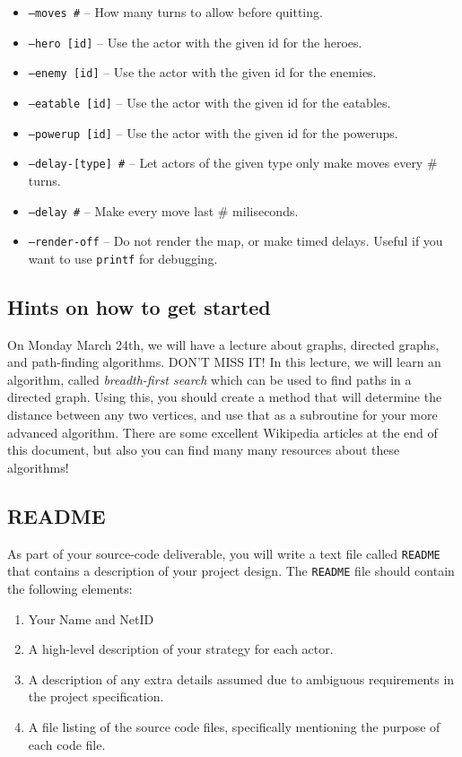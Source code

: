 \documentclass[11pt]{article}
\begin{document}
\begin{itemize}
\item \texttt{--moves \#} -- How many turns to allow before quitting.

\item \texttt{--hero [id]} -- Use the actor with the given id for the heroes.

\item \texttt{--enemy [id]} -- Use the actor with the given id for the enemies.

\item \texttt{--eatable [id]} -- Use the actor with the given id for the eatables.

\item \texttt{--powerup [id]} -- Use the actor with the given id for the powerups.

\item \texttt{--delay-[type] \#} -- Let actors of the given type only make moves every \# turns.

\item \texttt{--delay \#} -- Make every move last \# miliseconds.

\item \texttt{--render-off} -- Do not render the map, or make timed delays. Useful if you want to use \texttt{printf} for debugging.
\end{itemize}


\subsection{Hints on how to get started}

On Monday March 24th, we will have a lecture about graphs, directed graphs, and path-finding algorithms. DON'T MISS IT!
In this lecture, we will learn an algorithm, called \emph{breadth-first search} which can be used to find paths in a directed graph.
Using this, you should create a method that will determine the distance between any two vertices, and use that as a subroutine for your more advanced algorithm.
There are some excellent Wikipedia articles at the end of this document, but also you can find many many resources about these algorithms!



\subsection{README}

As part of your source-code deliverable, you will write a text file called \texttt{README} that contains a description of your project design.
The \texttt{README} file should contain the following elements:
\begin{enumerate}
\item Your Name and NetID
\item A high-level description of your strategy for each actor.
\item A description of any extra details assumed due to ambiguous requirements in the project specification.
\item A file listing of the source code files, specifically mentioning the purpose of each code file.
\end{enumerate}
\end{document}
